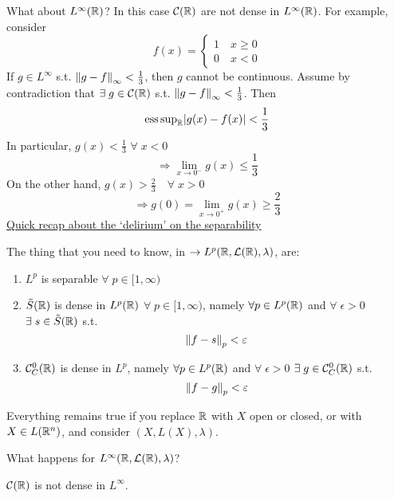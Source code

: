 What about \(L^\infty(\mathbb{R})\)? In this case \(\mathcal{C}(\mathbb{R})\) are not dense in \(L^\infty(\mathbb{R})\).
For example, consider 
\[
    f(x) =
    \begin{cases}
        1 \quad x \geq 0
        \\ 0 \quad x<0
    \end{cases}
\] 
If \(g \in L^\infty\) s.t. \(\norm{g-f}_\infty < \frac{1}{3}\), then \(g\) cannot be continuous. Assume by contradiction that \(\exists \; g \in \mathcal{C}(\mathbb{R})\) s.t. \(\norm{g-f}_\infty < \frac{1}{3}\). Then
\[
    \text{ess}\, \text{sup} _{\mathbb{R}} \abs{g(x)- f(x)} < \frac{1}{3}
\]
In particular, \(g(x) < \frac{1}{3}\) \(\forall \; x<0\)
\[
    \Rightarrow \lim_{x \to 0^-} g(x) \leq \frac{1}{3}
\]
On the other hand, \(g(x) > \frac{2}{3} \quad \forall \; x >0\)
\[
    \Rightarrow g(0)=\lim_{x \to 0^+} g(x) \geq \frac{2}{3}
\]
\noindent\underline{Quick recap about the `delirium' on the separability}

The thing that you need to know, in \(\to L^p(\mathbb{R}, \mathcal{L}(\mathbb{R}), \lambda)\), are:
\begin{enumerate}
    \item \(L^p\) is separable \(\forall\; p \in [1, \infty)\)
    \item \(\tilde{S}(\mathbb{R})\) is dense in \(L^p(\mathbb{R})\) \(\forall \; p \in [1, \infty)\), 
    namely \(\forall p \in L^p (\mathbb{R})\) and \(\forall \; \epsilon >0 \) \(\exists \; s \in \tilde{S}(\mathbb{R})\) s.t. 
    \[
        \norm{f-s}_p < \varepsilon
    \]
    \item \(\mathcal{C}_C^0 (\mathbb{R})\) is dense in \(L^p\), namely \(\forall p \in L^p (\mathbb{R})\) and \(\forall \; \epsilon >0 \) \(\exists \; g \in \mathcal{C}_C^0(\mathbb{R})\) s.t. 
    \[
        \norm{f-g}_p < \varepsilon
    \]
\end{enumerate}
Everything remains true if you replace \(\mathbb{R}\) with \(X\) open or closed, or with \(X \in L(\mathbb{R}^n)\), and consider \((X, L(X), \lambda)\).

What happens for \(L^{\infty}(\mathbb{R}, \mathcal{L}(\mathbb{R}), \lambda)\)? 

\(\mathcal{C}(\mathbb{R})\) is not dense in \(L^\infty\).


